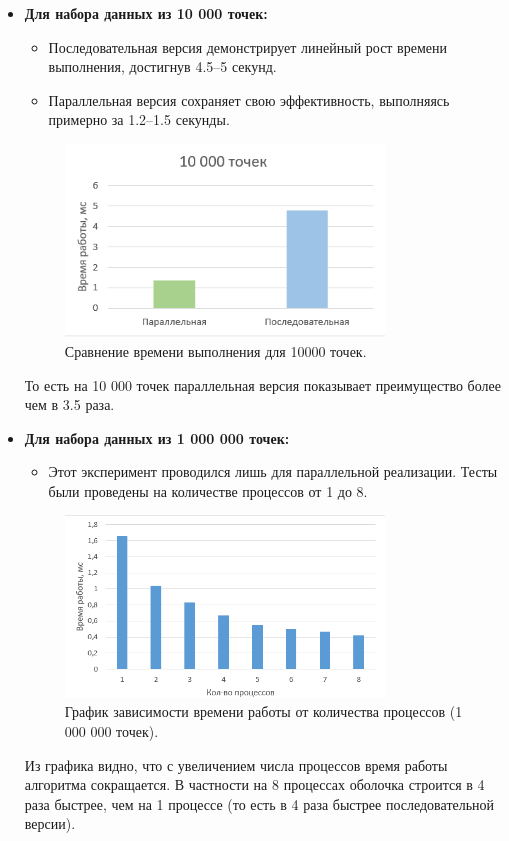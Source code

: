 \documentclass[a4paper,12pt]{article}
\begin{document}
\begin{itemize}
    \item \textbf{Для набора данных из 10 000 точек:}
    \begin{itemize}
        \item Последовательная версия демонстрирует линейный рост времени выполнения, достигнув 4.5–5 секунд.
        \item Параллельная версия сохраняет свою эффективность, выполняясь примерно за 1.2–1.5 секунды.
    \end{itemize}
    \begin{figure}[H]
    	\centering
    	\includegraphics[width=0.8\textwidth]{images/compare_10000.jpg} 
    	\caption{Сравнение времени выполнения для 10000 точек.}
    	\label{fig:compare_10000}
    \end{figure}	
    То есть на 10 000 точек параллельная версия показывает преимущество более чем в 3.5 раза.

    \item \textbf{Для набора данных из 1 000 000 точек:}
    \begin{itemize}
        \item Этот эксперимент проводился лишь для параллельной реализации. Тесты были проведены на количестве процессов от 1 до 8.
    \end{itemize}
    \begin{figure}[H]
    	\centering
    	\includegraphics[width=0.8\textwidth]{images/perf_tests_1mln.jpg} 
    	\caption{График зависимости времени работы от количества процессов (1 000 000 точек).}
    	\label{fig:perf_tests_1mln}
    \end{figure}
	Из графика видно, что с увеличением числа процессов время работы алгоритма сокращается. В частности на 8 процессах оболочка строится в 4 раза быстрее, чем на 1 процессе (то есть в 4 раза быстрее последовательной версии).
\end{itemize}
\end{document}
